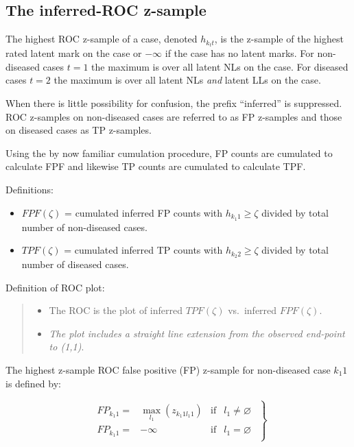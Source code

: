\documentclass[
]{book}
\providecommand{\tightlist}{%
  \setlength{\itemsep}{0pt}\setlength{\parskip}{0pt}}
\begin{document}
\hypertarget{empirical-ROC-fpf}{%
\subsection{The inferred-ROC z-sample}\label{empirical-ROC-fpf}}

The highest ROC z-sample of a case, denoted \(h_{k_t t}\), is the z-sample of the highest rated latent mark on the case or \(-\infty\) if the case has no latent marks. For non-diseased cases \(t = 1\) the maximum is over all latent NLs on the case. For diseased cases \(t = 2\) the maximum is over all latent NLs \emph{and} latent LLs on the case.

When there is little possibility for confusion, the prefix ``inferred'' is suppressed. ROC z-samples on non-diseased cases are referred to as FP z-samples and those on diseased cases as TP z-samples.

Using the by now familiar cumulation procedure, FP counts are cumulated to calculate FPF and likewise TP counts are cumulated to calculate TPF.

Definitions:

\begin{itemize}
\tightlist
\item
  \(FPF(\zeta)\) = cumulated inferred FP counts with \(h_{k_1 1} \geq \zeta\) divided by total number of non-diseased cases.
\item
  \(TPF(\zeta)\) = cumulated inferred TP counts with \(h_{k_2 2} \geq \zeta\) divided by total number of diseased cases.
\end{itemize}

Definition of ROC plot:

\begin{quote}
\begin{itemize}
\tightlist
\item
  The ROC is the plot of inferred \(TPF(\zeta)\) vs.~inferred \(FPF(\zeta)\).
\item
  \emph{The plot includes a straight line extension from the observed end-point to (1,1)}.
\end{itemize}
\end{quote}

The highest z-sample ROC false positive (FP) z-sample for non-diseased case \(k_1 1\) is defined by:

\begin{equation}
\left.
\begin{aligned}
\begin{matrix}
FP_{k_1 1}=&\max_{l_1} \left ( z_{k_1 1 l_1 1 } \right ) & \text{if} & l_1 \neq \varnothing\\
FP_{k_1 1}=&-\infty & \text{if} & l_1 = \varnothing
\end{matrix}
\end{aligned}
\right \}
\label{eq:empirical-FP}
\end{equation}
\end{document}

